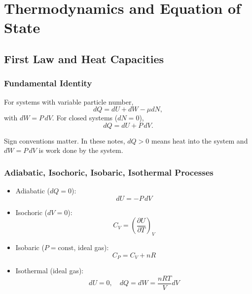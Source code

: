 \chapter{Thermodynamics and Equation of State}

\section{First Law and Heat Capacities}

\subsection{Fundamental Identity}
\begin{theory}
For systems with variable particle number,
\begin{equation}
    dQ = dU + dW - \mu dN,
\end{equation}
with $dW=P\,dV$. For closed systems ($dN=0$),
\begin{equation}
    dQ = dU + P\,dV.
\end{equation}
\end{theory}

\begin{importantnote}
Sign conventions matter. In these notes, $dQ>0$ means heat into the system and $dW=P\,dV$ is work done by the system.
\end{importantnote}

\subsection{Adiabatic, Isochoric, Isobaric, Isothermal Processes}
\begin{theory}
\begin{itemize}
    \item Adiabatic ($dQ=0$):
    \begin{equation}
        dU=-P\,dV
    \end{equation}
    \item Isochoric ($dV=0$):
    \begin{equation}
        C_V = \left(\frac{\partial U}{\partial T}\right)_V
    \end{equation}
    \item Isobaric ($P=\text{const}$, ideal gas):
    \begin{equation}
        C_P = C_V + nR
    \end{equation}
    \item Isothermal (ideal gas):
    \begin{equation}
        dU=0,\quad dQ=dW=\frac{nRT}{V}dV
    \end{equation}
\end{itemize}
\end{theory}


